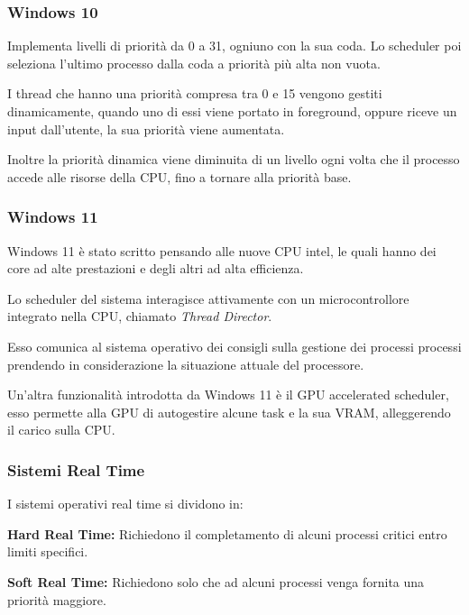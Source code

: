 \subsubsection{Windows 10}
Implementa livelli di priorità da 0 a 31, ogniuno con la sua coda. Lo scheduler poi seleziona l'ultimo processo dalla coda a priorità più alta non vuota.

\spacer
I thread che hanno una priorità compresa tra 0 e 15 vengono gestiti dinamicamente, quando uno di essi viene portato in foreground, oppure riceve un input dall'utente, la sua priorità viene aumentata.

Inoltre la priorità dinamica viene diminuita di un livello ogni volta che il processo accede alle risorse della CPU, fino a tornare alla priorità base.

\subsubsection{Windows 11}
Windows 11 è stato scritto pensando alle nuove CPU intel, le quali hanno dei core ad alte prestazioni e degli altri ad alta efficienza.

Lo scheduler del sistema interagisce attivamente con un microcontrollore integrato nella CPU, chiamato \textit{Thread Director}.

Esso comunica al sistema operativo dei consigli sulla gestione dei processi processi prendendo in considerazione la situazione attuale del processore.

\spacer
Un'altra funzionalità introdotta da Windows 11 è il GPU accelerated scheduler, esso permette alla GPU di autogestire alcune task e la sua VRAM, alleggerendo il carico sulla CPU.

\subsubsection{Sistemi Real Time}
I sistemi operativi real time si dividono in:
\begin{sitemize}
    \item \textbf{Hard Real Time:} Richiedono il completamento di alcuni processi critici entro limiti specifici.
    \item \textbf{Soft Real Time:} Richiedono solo che ad alcuni processi venga fornita una priorità maggiore.
\end{sitemize}
